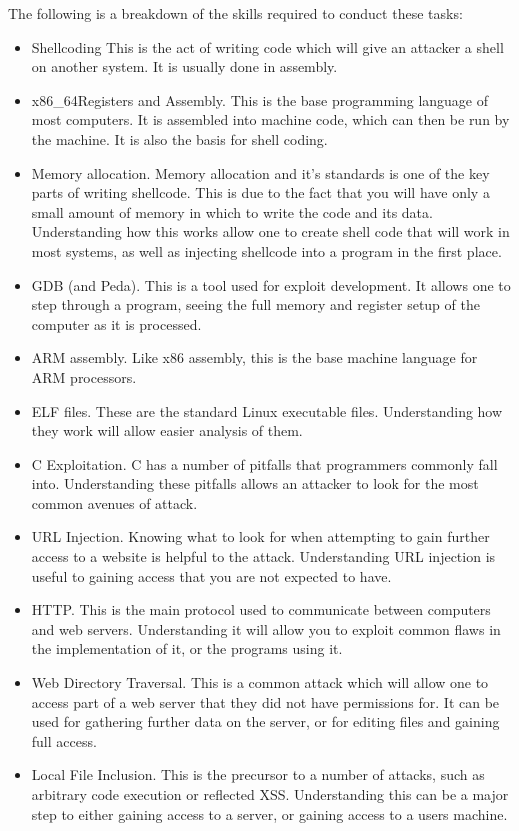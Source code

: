 \documentclass[a4paper,11pt]{report}
\begin{document}
			The following is a breakdown of the skills required to conduct these tasks:
			\begin{itemize}
				\item Shellcoding
					This is the act of writing code which will give an attacker a shell on another system. 
					It is usually done in assembly. 
				\item x86\_64Registers and Assembly. 
					This is the base programming language of most computers. 
					It is assembled into machine code, which can then be run by the machine. 
					It is also the basis for shell coding. 
				\item Memory allocation. 
					Memory allocation and it's standards is one of the key parts of writing shellcode. 
					This is due to the fact that you will have only a small amount of memory in which to write the code and its data. 
					Understanding how this works allow one to create shell code that will work in most systems, as well as injecting shellcode into a program in the first place. 
				\item GDB (and Peda).
					This is a tool used for exploit development. 
					It allows one to step through a program, seeing the full memory and register setup of the computer as it is processed. 
				\item ARM assembly.
					Like x86 assembly, this is the base machine language for ARM processors. 
				\item ELF files.
					These are the standard Linux executable files. 
					Understanding how they work will allow easier analysis of them. 
				\item C Exploitation.
					C has a number of pitfalls that programmers commonly fall into. 
					Understanding these pitfalls allows an attacker to look for the most common avenues of attack. 
				\item URL Injection.
					Knowing what to look for when attempting to gain further access to a website is helpful to the attack. 
					Understanding URL injection is useful to gaining access that you are not expected to have. 
				\item HTTP. 
					This is the main protocol used to communicate between computers and web servers. 
					Understanding it will allow you to exploit common flaws in the implementation of it, or the programs using it. 
				\item Web Directory Traversal. 
					This is a common attack which will allow one to access part of a web server that they did not have permissions for. 
					It can be used for gathering further data on the server, or for editing files and gaining full access. 
				\item Local File Inclusion.
					This is the precursor to a number of attacks, such as arbitrary code execution or reflected XSS. 
					Understanding this can be a major step to either gaining access to a server, or gaining access to a users machine. 
			\end{itemize}
\end{document}
